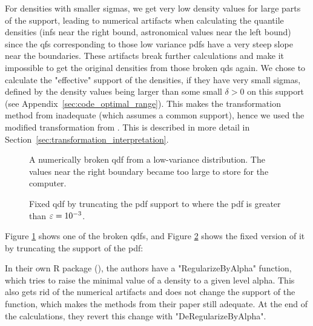 For densities with smaller sigmas, we get very low density values for large parts of the
support, leading to numerical artifacts when calculating the quantile densities (infs
near the right bound, astronomical values near the left bound) since the qfs corresponding to
those low variance pdfs have a very steep slope near the boundaries. These artifacts
break further calculations and make it impossible to get the original densities from those broken qds
again. We chose to calculate the "effective" support of the densities, if they have very
small sigmas, defined by the density values being larger than some small $\delta > 0$ on
this support (see Appendix~\ref{sec:code_optimal_range}). This makes the transformation
method from \textcite{PetersenMüller2016} inadequate (which assumes a common support),
hence we used the modified transformation from \textcite{KokoszkaEtAl2019}. This is
described in more detail in Section~\ref{sec:transformation_interpretation}.

\begin{figure}[h]
    \centering
    \resizebox{0.9\textwidth}{!}{}
    \caption[Example of broken qdf]{A numerically broken qdf from a low-variance distribution.
    The values near the right boundary became too large to store for the computer.}
    \label{fig:broken_qdf}
\end{figure}

\begin{figure}[h]
    \centering
    \resizebox{0.9\textwidth}{!}{}
    \caption[Example of fixed qdf]{Fixed qdf by truncating the pdf support to where
    the pdf is greater than $\varepsilon = \nobreak 10^{-3}$.}
    \label{fig:fixed_qdf}
\end{figure}

Figure \ref{fig:broken_qdf} shows one of the broken qdfs, and Figure \ref{fig:fixed_qdf}
shows the fixed version of it by truncating the support of the pdf:

In their own R package (), the authors have a "RegularizeByAlpha"
function, which tries to raise the minimal value of a density to a given level alpha. This
also gets rid of the numerical artifacts and does not change the support of the function,
which makes the methods from their paper still adequate. At the end of the calculations, they
revert this change with "DeRegularizeByAlpha".